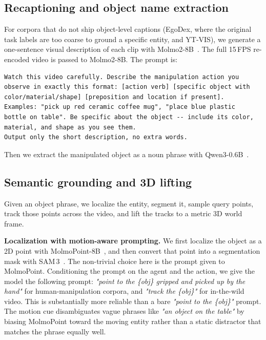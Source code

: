 \subsection{Recaptioning and object name extraction}
\label{appsec:phrase_extraction}

For corpora that do not ship object-level captions (EgoDex, where the original task labels are too coarse to ground a specific entity, and YT-VIS), we generate a one-sentence visual description of each clip with Molmo2-8B~\cite{clark2026molmo2}. The full 15\,FPS re-encoded video is passed to Molmo2-8B. The prompt is:
\begin{verbatim}
Watch this video carefully. Describe the manipulation action you
observe in exactly this format: [action verb] [specific object with
color/material/shape] [preposition and location if present].
Examples: "pick up red ceramic coffee mug", "place blue plastic
bottle on table". Be specific about the object -- include its color,
material, and shape as you see them.
Output only the short description, no extra words.
\end{verbatim}

Then we extract the manipulated object as a noun phrase with Qwen3-0.6B~\cite{yang2025qwen3}.


\subsection{Semantic grounding and 3D lifting}
\label{appsec:grounding_lifting}

Given an object phrase, we localize the entity, segment it, sample query points, track those points across the video, and lift the tracks to a metric 3D world frame.

\noindent\textbf{Localization with motion-aware prompting.}
We first localize the object as a 2D point with MolmoPoint-8B~\cite{clark2026molmopoint}, and then convert that point into a segmentation mask with SAM\,3~\cite{sam3}. The non-trivial choice here is the prompt given to MolmoPoint. Conditioning the prompt on the agent and the action, we give the model the following prompt: \textit{"point to the \{obj\} gripped and picked up by the hand"} for human-manipulation corpora, and \textit{"track the \{obj\}"} for in-the-wild video. This is substantially more reliable than a bare \textit{"point to the \{obj\}"} prompt. The motion cue disambiguates vague phrases like \textit{"an object on the table"} by biasing MolmoPoint toward the moving entity rather than a static distractor that matches the phrase equally well.

